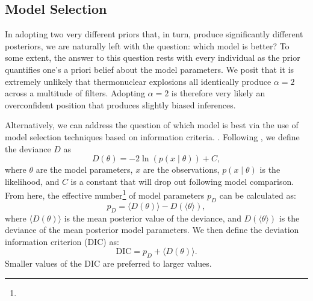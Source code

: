 \documentclass[twocolumn]{./aastex63}
\begin{document}
\subsection{Model Selection}\label{sec:dic}

In adopting two very different priors that, in turn, produce significantly
different posteriors, we are naturally left with the question: which model is
better? To some extent, the answer to this question rests with every
individual as the prior quantifies one's a priori belief about the model
parameters. We posit that it is extremely unlikely that thermonuclear
explosions all identically produce $\alpha = 2$ across a multitude of filters.
Adopting $\alpha = 2$ is therefore very likely an overconfident position that
produces slightly biased inferences.

Alternatively, we can address the question of which model is best via the use
of model selection techniques based on information criteria. .
Following \citet{Spiegelhalter02}, we define the deviance $D$ as
%
$$D(\theta) = -2 \ln \left(p(x\mid \theta)\right) + C,$$
%
where $\theta$ are the model parameters, $x$ are the observations, $p(x\mid
\theta)$ is the likelihood, and $C$ is a constant that will drop out following
model comparison. From here, the effective number\footnote{}
of model parameters $p_D$ can be calculated as:
%
$$p_D = \langle D(\theta) \rangle - D(\langle \theta \rangle),$$
%
where $\langle D(\theta) \rangle$ is the mean posterior value of the deviance,
and $D(\langle \theta \rangle)$ is the deviance of the mean posterior model
parameters. We then define the deviation information criterion (DIC) as:
%
$$\mathrm{DIC} = p_D + \langle D(\theta) \rangle.$$
% 
Smaller values of  the DIC are  preferred to larger values.
\end{document}
